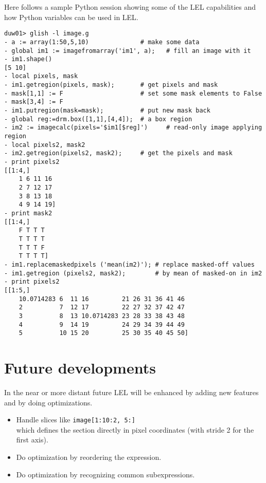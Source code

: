 Here follows a sample Python session showing some of the LEL
capabilities and how Python variables can be used in LEL.
\begin{verbatim}
duw01> glish -l image.g
- a := array(1:50,5,10)              # make some data
- global im1 := imagefromarray('im1', a);   # fill an image with it
- im1.shape()
[5 10]
- local pixels, mask
- im1.getregion(pixels, mask);       # get pixels and mask
- mask[1,1] := F                     # set some mask elements to False
- mask[3,4] := F
- im1.putregion(mask=mask);          # put new mask back
- global reg:=drm.box([1,1],[4,4]);  # a box region
- im2 := imagecalc(pixels='$im1[$reg]')     # read-only image applying region
- local pixels2, mask2
- im2.getregion(pixels2, mask2);     # get the pixels and mask
- print pixels2
[[1:4,]
    1 6 11 16
    2 7 12 17
    3 8 13 18
    4 9 14 19] 
- print mask2
[[1:4,]
    F T T T
    T T T T
    T T T F
    T T T T] 
- im1.replacemaskedpixels ('mean(im2)'); # replace masked-off values
- im1.getregion (pixels2, mask2);        # by mean of masked-on in im2
- print pixels2
[[1:5,]
    10.0714283 6  11 16         21 26 31 36 41 46
    2          7  12 17         22 27 32 37 42 47
    3          8  13 10.0714283 23 28 33 38 43 48
    4          9  14 19         24 29 34 39 44 49
    5          10 15 20         25 30 35 40 45 50]
\end{verbatim}

\section{Future developments}
In the near or more distant future LEL will be enhanced by adding new
features and by doing optimizations.
\begin{itemize}
  \item Handle slices like \texttt{image[1:10:2, 5:]}
        \\which defines the section directly in pixel coordinates (with
        stride 2 for the first axis).
  \item Do optimization by reordering the expression.
  \item Do optimization by recognizing common subexpressions.
\end{itemize}
